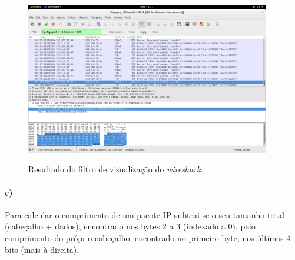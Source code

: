 \begin{figure}[h]
\centering
\includegraphics[width=0.95\textwidth, height=0.5\textheight]{3_b_screenshot.png}
\label{fig:wireshark}
\caption{Resultado do filtro de visualização do \emph{wireshark}.}
\end{figure}
\newpage
\paragraph{c)}
Para calcular o comprimento de um pacote IP subtrai-se o seu tamanho total (cabeçalho + dados), encontrado nos bytes 2 a 3 (indexado a 0), pelo comprimento do próprio cabeçalho, encontrado no primeiro byte, nos últimos 4 bits (mais à direita).